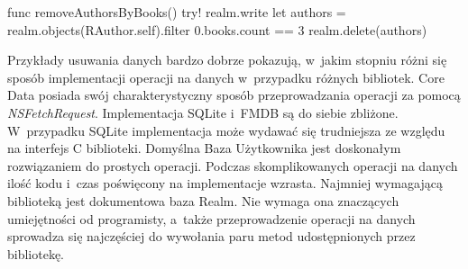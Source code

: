 \begin{code}[
		language=swift,
		caption={Przykład usuwania danych Realm},
		label={lis:realm_delete_code},
	]
    func removeAuthorsByBooks() {
        try! realm.write {
            let authors = realm.objects(RAuthor.self).filter { 0.books.count == 3 }
            realm.delete(authors)
        }
    }
\end{code}
\bigskip

Przykłady usuwania danych bardzo dobrze pokazują, w~jakim stopniu różni się sposób implementacji operacji na danych w~przypadku różnych bibliotek. Core Data posiada swój charakterystyczny sposób przeprowadzania operacji za pomocą \textit{NSFetchRequest}. Implementacja SQLite i~FMDB są do siebie zbliżone. W~przypadku SQLite implementacja może wydawać się trudniejsza ze względu na interfejs C biblioteki. Domyślna Baza Użytkownika jest doskonałym rozwiązaniem do prostych operacji. Podczas skomplikowanych operacji na danych ilość kodu i~czas poświęcony na implementacje wzrasta. Najmniej wymagającą biblioteką jest dokumentowa baza Realm. Nie wymaga ona znaczących umiejętności od programisty, a~także przeprowadzenie operacji na danych sprowadza się najczęściej do wywołania paru metod udostępnionych przez bibliotekę.